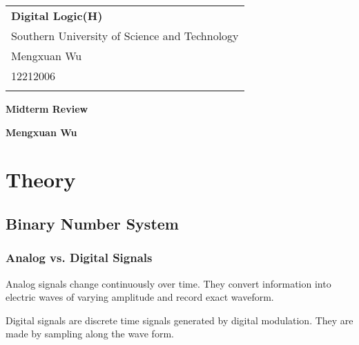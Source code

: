 \documentclass[a4paper,12pt]{article}
\begin{document}
\thispagestyle{empty} %

\begin{tabular}{p{15.5cm}}
{\large \bf Digital Logic(H)} \\
Southern University of Science and Technology \\ Mengxuan Wu \\ 12212006 \\
\hline
\\
\end{tabular}

\vspace*{0.3cm} %

\begin{center}
	{\Large \bf Midterm Review}
	\vspace{2mm}

	{\bf Mengxuan Wu}
		
\end{center}  

\vspace{0.4cm}

\section{Theory}

\subsection{Binary Number System}

\subsubsection{Analog vs. Digital Signals}

Analog signals change continuously over time. 
They convert information into electric waves of varying amplitude and record exact waveform.

Digital signals are discrete time signals generated by digital modulation. 
They are made by sampling along the wave form.

\begin{center}
\end{center}
\end{document}
